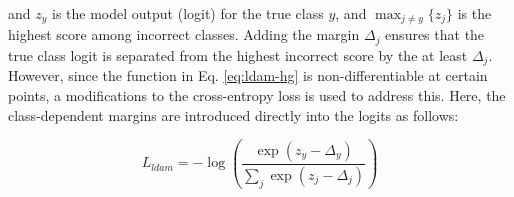 \noindent and $z_y$ is the model output (logit) for the true class $y$, and $\max_{j \neq y}\{z_j\}$ is the highest score among incorrect classes. Adding the margin $\Delta_j$ ensures that the true class logit is separated from the highest incorrect score by the at least $\Delta_j$. However, since the function in Eq. \eqref{eq:ldam-hg} is non-differentiable at certain points, a modifications to the cross-entropy loss is used to address this. Here, the class-dependent margins are introduced directly into the logits as follows:

\begin{equation}
    \label{eq:ldam}
    L_{ldam} = - \log\left( \frac{\exp(z_y - \Delta_y)}{\sum_j \exp(z_j - \Delta_j)} \right)
\end{equation}